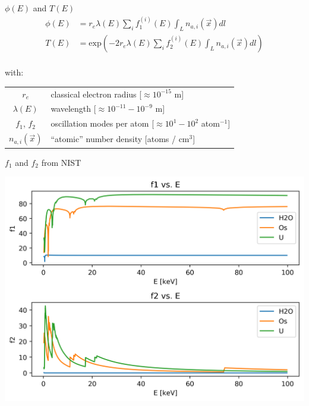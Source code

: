 \documentclass[presentation]{beamer}
\begin{document}
\begin{frame}{$\phi(E)$ and $T(E)$}
  \begin{align}
    \phi(E) &= r_e \lambda(E) \sum_i f_1^{(i)}(E) \int_L n_{a,i}(\vec{x})dl\\[6pt]
    T(E) &= \text{exp}\left(-2r_e \lambda(E) \sum_i f_2^{(i)}(E) \int_L n_{a,i}(\vec{x})dl\right)\\
  \end{align}

  with:\newline

  \begin{tabular}{c l}
    $r_e$ & classical electron radius [$\approx 10^{-15}$ m]\\
    $\lambda(E)$ & wavelength [$\approx 10^{-11} - 10^{-9}$ m]\\
    $f_1$, $f_2$ & oscillation modes per atom [$\approx 10^{1}-10^{2}$ atom$^{-1}$]\\
    $n_{a,i}(\vec{x})$ & ``atomic'' number density [atoms / cm$^3$]
  \end{tabular}
  
\end{frame}

\begin{frame}{$f_1$ and $f_2$ from NIST}

  \centering
  \includegraphics[width=0.8\linewidth]{figs/f1_f2}

\end{frame}
\end{document}
